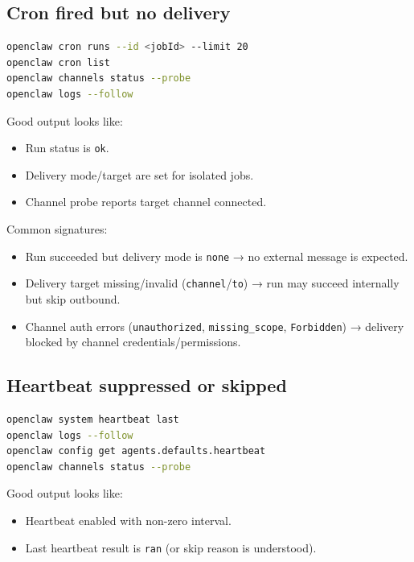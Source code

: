 \subsection{Cron fired but no delivery}


\begin{lstlisting}[language=bash]
openclaw cron runs --id <jobId> --limit 20
openclaw cron list
openclaw channels status --probe
openclaw logs --follow
\end{lstlisting}


Good output looks like:

\begin{itemize}
  \item Run status is \texttt{ok}.
  \item Delivery mode/target are set for isolated jobs.
  \item Channel probe reports target channel connected.
\end{itemize}


Common signatures:

\begin{itemize}
  \item Run succeeded but delivery mode is \texttt{none} → no external message is expected.
  \item Delivery target missing/invalid (\texttt{channel}/\texttt{to}) → run may succeed internally but skip outbound.
  \item Channel auth errors (\texttt{unauthorized}, \texttt{missing\_scope}, \texttt{Forbidden}) → delivery blocked by channel credentials/permissions.
\end{itemize}


\subsection{Heartbeat suppressed or skipped}


\begin{lstlisting}[language=bash]
openclaw system heartbeat last
openclaw logs --follow
openclaw config get agents.defaults.heartbeat
openclaw channels status --probe
\end{lstlisting}


Good output looks like:

\begin{itemize}
  \item Heartbeat enabled with non-zero interval.
  \item Last heartbeat result is \texttt{ran} (or skip reason is understood).
\end{itemize}


